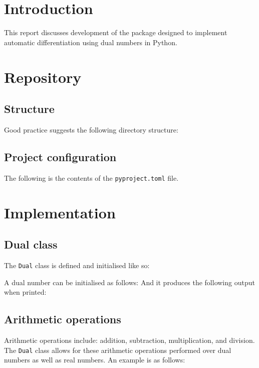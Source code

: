 \documentclass[11pt,a4paper]{article}
\begin{document}

\section{Introduction}
This report discusses development of the package designed to implement automatic differentiation using dual numbers in Python. 

\section{Repository}
\subsection{Structure}
Good practice suggests the following directory structure:


\subsection{Project configuration}
The following is the contents of the \texttt{pyproject.toml} file.


\section{Implementation}
\subsection{Dual class}
The \texttt{Dual} class is defined and initialised like so:

A dual number can be initialised as follows:
And it produces the following output when printed:
\subsection{Arithmetic operations}
Arithmetic operations include: addition, subtraction, multiplication, and division. The \texttt{Dual} class allows for these arithmetic operations performed over dual numbers as well as real numbers.
An example is as follows:
\end{document}
